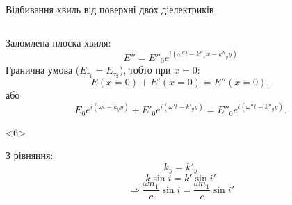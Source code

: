 \documentclass[onlytextwidth]{beamer}
\begin{document}
\begin{frame}[t]{Відбивання хвиль від поверхні двох діелектриків}
\begin{columns}
\begin{column}{0.5\linewidth}
{\begin{block}{}
					Заломлена плоска хвиля:
					\begin{equation*}
						E'' = E''_0 e^{i(\omega'' t - k''_xx-k''_yy)}
					\end{equation*}
					Гранична умова ($E_{\tau_1} = E_{\tau_2}$), тобто при $x = 0$:
					\begin{equation*}
						E(x=0) + E'(x=0) = E''(x=0),
					\end{equation*}
					або
					\begin{equation*}
						E_0 e^{i(\omega t -k_yy)} + E'_0 e^{i(\omega' t - k'_yy)} =E''_0 e^{i(\omega'' t - k''_yy)}.
					\end{equation*}
				\end{block}
			}
			\begin{onlyenv}<6>
				\begin{block}{}\justifying
					З рівняння:
					\begin{equation*}
						k_y = k'_y
					\end{equation*}
					\begin{equation*}
						k\sin i = k'\sin i'
					\end{equation*}
					\begin{equation*}
						\Rightarrow \frac{\omega n_1}{c} \sin i = \frac{\omega n_1}{c} \sin i'

\end{equation*}
\end{block}
\end{onlyenv}
\end{column}
\end{columns}
\end{frame}
\end{document}
